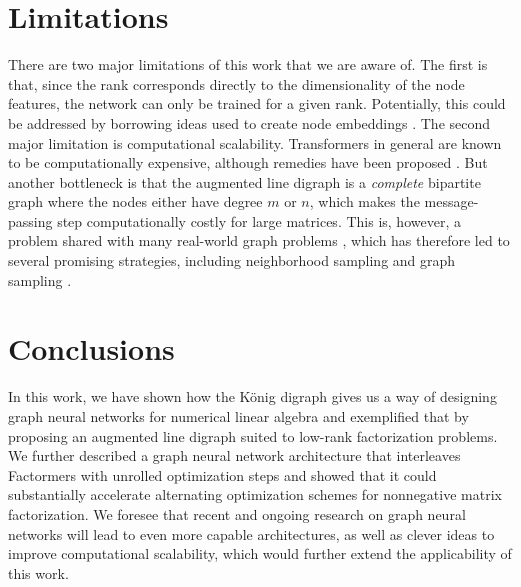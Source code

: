 \documentclass{article}
\begin{document}
\section{Limitations}
There are two major limitations of this work that we are aware of. The first is that, since the rank corresponds directly to the dimensionality of the node features, the network can only be trained for a given rank. Potentially, this could be addressed by borrowing ideas used to create node embeddings \citep{Hamilton2017}. The second major limitation is computational scalability. Transformers in general are known to be computationally expensive, although remedies have been proposed \citep{Kitaev2020}. But another bottleneck is that the augmented line digraph is a \emph{complete} bipartite graph where the nodes either have degree $m$ or $n$, which makes the message-passing step computationally costly for large matrices. This is, however, a problem shared with many real-world graph problems \citep{Li2021}, which has therefore led to several promising strategies, including neighborhood sampling \citep{Hamilton2017,Chen2018} and graph sampling \citep{Zeng2019}. 





\section{Conclusions}
In this work, we have shown how the König digraph gives us a way of designing graph neural networks for numerical linear algebra and exemplified that by proposing an augmented line digraph suited to low-rank factorization problems. We further described a graph neural network architecture that interleaves Factormers with unrolled optimization steps and showed that it could substantially accelerate alternating optimization schemes for nonnegative matrix factorization.
We foresee that recent and ongoing research on graph neural networks will lead to even more capable architectures, as well as clever ideas to improve computational scalability, which would further extend the applicability of this work.
\end{document}
